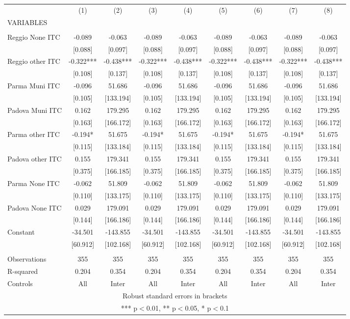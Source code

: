 \begin{tabular}{lcccccccc} \hline
 & (1) & (2) & (3) & (4) & (5) & (6) & (7) & (8) \\
VARIABLES &  &  &  &  &  &  &  &  \\ \hline
 &  &  &  &  &  &  &  &  \\
Reggio None ITC & -0.089 & -0.063 & -0.089 & -0.063 & -0.089 & -0.063 & -0.089 & -0.063 \\
 & [0.088] & [0.097] & [0.088] & [0.097] & [0.088] & [0.097] & [0.088] & [0.097] \\
Reggio other ITC & -0.322*** & -0.438*** & -0.322*** & -0.438*** & -0.322*** & -0.438*** & -0.322*** & -0.438*** \\
 & [0.108] & [0.137] & [0.108] & [0.137] & [0.108] & [0.137] & [0.108] & [0.137] \\
Parma Muni ITC & -0.096 & 51.686 & -0.096 & 51.686 & -0.096 & 51.686 & -0.096 & 51.686 \\
 & [0.105] & [133.194] & [0.105] & [133.194] & [0.105] & [133.194] & [0.105] & [133.194] \\
Padova Muni ITC & 0.162 & 179.295 & 0.162 & 179.295 & 0.162 & 179.295 & 0.162 & 179.295 \\
 & [0.163] & [166.172] & [0.163] & [166.172] & [0.163] & [166.172] & [0.163] & [166.172] \\
Parma other ITC & -0.194* & 51.675 & -0.194* & 51.675 & -0.194* & 51.675 & -0.194* & 51.675 \\
 & [0.115] & [133.184] & [0.115] & [133.184] & [0.115] & [133.184] & [0.115] & [133.184] \\
Padova other ITC & 0.155 & 179.341 & 0.155 & 179.341 & 0.155 & 179.341 & 0.155 & 179.341 \\
 & [0.375] & [166.185] & [0.375] & [166.185] & [0.375] & [166.185] & [0.375] & [166.185] \\
Parma None ITC & -0.062 & 51.809 & -0.062 & 51.809 & -0.062 & 51.809 & -0.062 & 51.809 \\
 & [0.110] & [133.175] & [0.110] & [133.175] & [0.110] & [133.175] & [0.110] & [133.175] \\
Padova None ITC & 0.029 & 179.091 & 0.029 & 179.091 & 0.029 & 179.091 & 0.029 & 179.091 \\
 & [0.144] & [166.186] & [0.144] & [166.186] & [0.144] & [166.186] & [0.144] & [166.186] \\
Constant & -34.501 & -143.855 & -34.501 & -143.855 & -34.501 & -143.855 & -34.501 & -143.855 \\
 & [60.912] & [102.168] & [60.912] & [102.168] & [60.912] & [102.168] & [60.912] & [102.168] \\
 &  &  &  &  &  &  &  &  \\
Observations & 355 & 355 & 355 & 355 & 355 & 355 & 355 & 355 \\
R-squared & 0.204 & 0.354 & 0.204 & 0.354 & 0.204 & 0.354 & 0.204 & 0.354 \\
 Controls & All & Inter & All & Inter & All & Inter & All & Inter \\ \hline
\multicolumn{9}{c}{ Robust standard errors in brackets} \\
\multicolumn{9}{c}{ *** p$<$0.01, ** p$<$0.05, * p$<$0.1} \\
\end{tabular}
